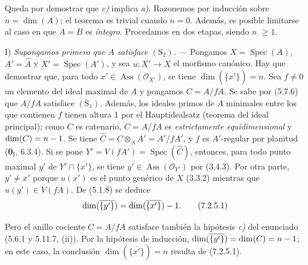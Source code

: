 Queda por demostrar que \emph{c)} implica \emph{a)}. Razonemos por inducción
sobre $n=\dim(A)$; el teorema es trivial cuando $n=0$. Además,
es posible limitarse al caso en que $A=B$ es \emph{íntegro}. Procedamos en
dos etapas, siendo $n$ $\geqslant1$.

\medskip\noindent
I) \emph{Supongamos primero que $A$ satisface $(\mathrm S_2)$.} ---
Pongamos $X=\operatorname{Spec}(A)$, $A'=\widehat A$ y
$X'=\operatorname{Spec}(A')$, y sea $u:X'\to X$ el morfismo
canónico. Hay que demostrar que, para todo
$x'\in\operatorname{Ass}(\mathscr O_{X'})$, se tiene
$\dim(\overline{\{x'\}})=n$. Sea $f\neq0$ un elemento del ideal
maximal de $A$ y pongamos $C=A/fA$. Se sabe por (5.7.6) que
$A/fA$ satisface $(\mathrm S_1)$. Además, los ideales primos de
$A$ minimales entre los que contienen $f$ tienen altura 1 por
el Hauptidealsatz (teorema del ideal principal); como $C$ es
catenario, $C=A/fA$ es \emph{estrictamente equidimensional} y
$\dim(C)=n- 1$. Se tiene
$\widehat C=C\otimes_AA'=A'/fA'$, y $f$ es $A'$-regular por
planitud (\textbf 0$_{\mathrm I}$, 6.3.4). Si se pone
$Y'=V(fA')=\operatorname{Spec}(\widehat C)$, entonces, para todo
punto maximal $y'$ de $Y'\cap\overline{\{x'\}}$, se tiene
$y'\in\operatorname{Ass}(\mathscr O_{Y'})$ por (3.4.3).
Por otra parte, $y'\neq x'$ porque $u(x')$ es el punto genérico
de $X$ (3.3.2) mientras que $u(y')\in V(fA)$. De (5.1.8) se
deduce
\begin{equation}
\dim(\overline{\{y'\}})=\dim(\overline{\{x'\}})- 1.
\tag{7.2.5.1}
\label{IV.2.eq.7.2.5.1-fr}
\end{equation}

Pero el anillo cociente $C=A/fA$ satisface también la hipótesis
\emph{c)} del enunciado (5.6.1 y 5.11.7, (ii)). Por la hipótesis de
inducción, $\dim(\overline{\{y'\}})=\dim(C)=n- 1$; en este caso,
la conclusión $\dim(\overline{\{x'\}})=n$ resulta de (7.2.5.1).

